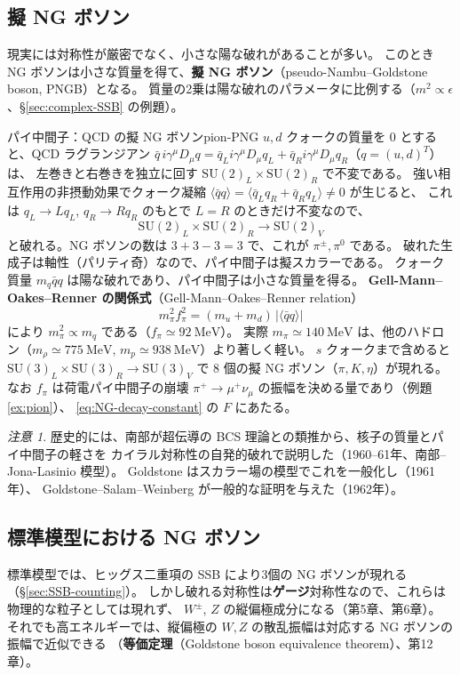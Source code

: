 \documentclass[uplatex,dvipdfmx,a4paper,11pt,openany]{jsbook}
\newcommand{\term}[2]{\textbf{#1}（#2）}
\numberwithin{equation}{chapter}
\theoremstyle{definition}
\theoremstyle{plain}
\theoremstyle{remark}
\newtheorem{remark}{注意}[chapter]
\newcommand{\SU}{\mathrm{SU}}
\begin{document}
\subsection{擬 NG ボソン}
現実には対称性が厳密でなく、小さな陽な破れがあることが多い。
このとき NG ボソンは小さな質量を得て、\term{擬 NG ボソン}{pseudo-Nambu--Goldstone boson, PNGB}となる。
質量の2乗は陽な破れのパラメータに比例する（$m^2\propto\epsilon$、\S\ref{sec:complex-SSB} の例題）。
\begin{myex}{パイ中間子：QCD の擬 NG ボソン}{pion-PNG}
$u,d$ クォークの質量を 0 とすると、QCD ラグランジアン
$\bar q\,i\gamma^\mu D_\mu q=\bar q_Li\gamma^\mu D_\mu q_L+\bar q_Ri\gamma^\mu D_\mu q_R$（$q=(u,d)^T$）は、
左巻きと右巻きを独立に回す $\SU(2)_L\times\SU(2)_R$ で不変である。
強い相互作用の非摂動効果でクォーク凝縮 $\langle\bar qq\rangle=\langle\bar q_Lq_R+\bar q_Rq_L\rangle\ne0$ が生じると、
これは $q_L\to Lq_L$, $q_R\to Rq_R$ のもとで $L=R$ のときだけ不変なので、
\[
\SU(2)_L\times\SU(2)_R\to\SU(2)_V
\]
と破れる。NG ボソンの数は $3+3-3=3$ で、これが $\pi^\pm,\pi^0$ である。
破れた生成子は軸性（パリティ奇）なので、パイ中間子は擬スカラーである。
\tcblower
クォーク質量 $m_q\bar qq$ は陽な破れであり、パイ中間子は小さな質量を得る。
\term{Gell-Mann--Oakes--Renner の関係式}{Gell-Mann--Oakes--Renner relation}
\[
m_\pi^2f_\pi^2=(m_u+m_d)\,|\langle\bar qq\rangle|
\]
により $m_\pi^2\propto m_q$ である（$f_\pi\simeq92\ \mathrm{MeV}$）。
実際 $m_\pi\simeq140\ \mathrm{MeV}$ は、他のハドロン（$m_\rho\simeq775\ \mathrm{MeV}$, $m_p\simeq938\ \mathrm{MeV}$）より著しく軽い。
$s$ クォークまで含めると $\SU(3)_L\times\SU(3)_R\to\SU(3)_V$ で $8$ 個の擬 NG ボソン（$\pi,K,\eta$）が現れる。
なお $f_\pi$ は荷電パイ中間子の崩壊 $\pi^+\to\mu^+\nu_\mu$ の振幅を決める量であり（例題\ref{ex:pion}）、
\eqref{eq:NG-decay-constant} の $F$ にあたる。
\end{myex}
\begin{remark}
歴史的には、南部が超伝導の BCS 理論との類推から、核子の質量とパイ中間子の軽さを
カイラル対称性の自発的破れで説明した（1960--61年、南部--Jona-Lasinio 模型）。
Goldstone はスカラー場の模型でこれを一般化し（1961年）、
Goldstone--Salam--Weinberg が一般的な証明を与えた（1962年）。
\end{remark}
\subsection{標準模型における NG ボソン}
標準模型では、ヒッグス二重項の SSB により3個の NG ボソンが現れる（\S\ref{sec:SSB-counting}）。
しかし破れる対称性は\textbf{ゲージ}対称性なので、これらは物理的な粒子としては現れず、
$W^\pm$, $Z$ の縦偏極成分になる（第5章、第6章）。
それでも高エネルギーでは、縦偏極の $W,Z$ の散乱振幅は対応する NG ボソンの振幅で近似できる
（\term{等価定理}{Goldstone boson equivalence theorem}、第12章）。
\end{document}
